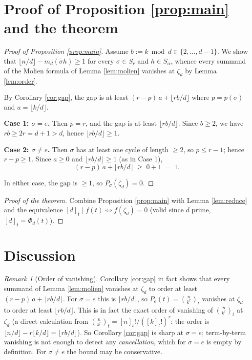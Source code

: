 \documentclass[11pt]{article}
\theoremstyle{plain}
\theoremstyle{definition}
\theoremstyle{remark}
\newtheorem*{remark}{Remark}
\begin{document}
\section{Proof of Proposition \ref{prop:main} and the theorem}

\begin{proof}[Proof of Proposition \ref{prop:main}]
Assume $b := k \bmod d \in \{2, \ldots, d-1\}$. We show that
$\lfloor n/d\rfloor - m_d(\tilde\sigma h) \ge 1$ for every $\sigma \in S_r$
and $h \in S_\alpha$, whence every summand of the Molien formula of
Lemma \ref{lem:molien} vanishes at $\zeta_d$ by Lemma \ref{lem:order}.

By Corollary \ref{cor:gap}, the gap is at least
$(r - p)\,a + \lfloor rb/d\rfloor$ where $p = p(\sigma)$ and $a = \lfloor k/d\rfloor$.

\smallskip
\textbf{Case 1: $\sigma = e$.} Then $p = r$, and the gap is at least
$\lfloor rb/d\rfloor$. Since $b \ge 2$, we have $rb \ge 2r = d + 1 > d$,
hence $\lfloor rb/d\rfloor \ge 1$.

\smallskip
\textbf{Case 2: $\sigma \ne e$.} Then $\sigma$ has at least one cycle of
length $\ge 2$, so $p \le r - 1$; hence $r - p \ge 1$. Since $a \ge 0$
and $\lfloor rb/d\rfloor \ge 1$ (as in Case 1),
\[
(r - p)\,a + \lfloor rb/d\rfloor \;\ge\; 0 + 1 \;=\; 1.
\]

In either case, the gap is $\ge 1$, so $P_\sigma(\zeta_d) = 0$.
\end{proof}

\begin{proof}[Proof of the theorem]
Combine Proposition \ref{prop:main} with Lemma \ref{lem:reduce} and the
equivalence $[d]_t \mid f(t) \iff f(\zeta_d) = 0$ (valid since $d$ prime,
$[d]_t = \Phi_d(t)$).
\end{proof}

\section{Discussion}

\begin{remark}[Order of vanishing]
Corollary \ref{cor:gap} in fact shows that every summand of Lemma
\ref{lem:molien} vanishes at $\zeta_d$ to order at least
$(r - p)\,a + \lfloor rb/d\rfloor$. For $\sigma = e$ this is $\lfloor rb/d\rfloor$,
so $P_e(t) = \binom{n}{k^r}_t$ vanishes at $\zeta_d$ to order at least
$\lfloor rb/d\rfloor$. This is in fact the exact order of vanishing
of $\binom{n}{k^r}_t$ at $\zeta_d$ (a direct calculation from
$\binom{n}{k^r}_t = [n]_t!/([k]_t!)^r$: the order is
$\lfloor n/d\rfloor - r\lfloor k/d\rfloor = \lfloor rb/d\rfloor$).
So Corollary \ref{cor:gap} is sharp at $\sigma = e$; term-by-term
vanishing is not enough to detect any \emph{cancellation}, which for
$\sigma = e$ is empty by definition. For $\sigma \ne e$ the bound may
be conservative.
\end{remark}
\end{document}
